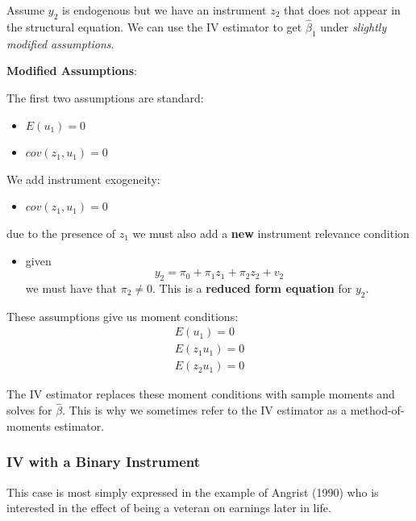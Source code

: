 \documentclass[11pt]{article}
\begin{document}
Assume $y_2$ is endogenous but we have an instrument $z_2$ that does not appear in the structural equation. We can use the IV estimator to get $\hat{\beta}_1$ under \textit{slightly modified assumptions}.
\begin{shaded}
    \textbf{Modified Assumptions}:

    The first two assumptions are standard:
    \begin{itemize}
        \item $E(u_1) = 0$
        \item $cov(z_1,u_1) = 0$
    \end{itemize}

    We add instrument exogeneity:
    \begin{itemize}
        \item $cov(z_1,u_1)=0$
    \end{itemize}
    due to the presence of $z_1$ we must also add a \textbf{new} instrument relevance condition
    \begin{itemize}
        \item given
        \begin{equation}
y_2=\pi_0+\pi_1 z_1+\pi_2 z_2+v_2
\end{equation}
we must have that $\pi_2 \neq0$. This is a \textbf{reduced form equation} for $y_2$.
    \end{itemize}

    These assumptions give us moment conditions:
    \begin{gather*}
        E(u_1) = 0 \\
        E(z_1 u_1) = 0 \\
        E(z_2 u_1) = 0
    \end{gather*}
\begin{note}
    The IV estimator replaces these moment conditions with sample moments and solves for $\hat{\beta}$. This is why we sometimes refer to the IV estimator as a method-of-moments estimator.
\end{note}
\end{shaded}

\subsubsection{IV with a Binary Instrument}

This case is most simply expressed in the example of Angrist (1990) who is interested in the effect of being a veteran on earnings later in life.
\end{document}
